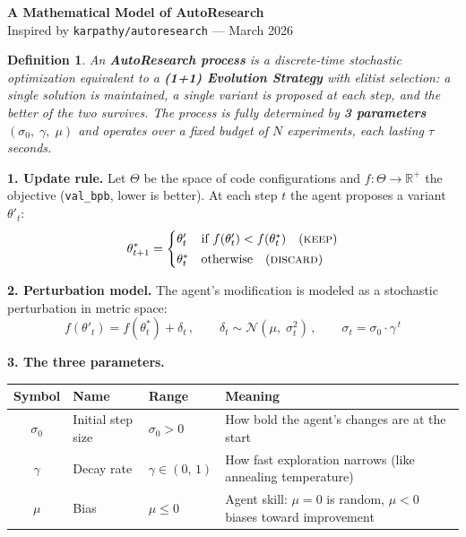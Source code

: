 \documentclass[10pt,a4paper]{article}
\newtheorem*{definition}{Definition}
\begin{document}
\begin{center}
{\Large\bfseries A Mathematical Model of AutoResearch}\\[3pt]
{\small Inspired by \texttt{karpathy/autoresearch} --- March 2026}
\end{center}

\vspace{0.4em}

\begin{definition}
An \textbf{AutoResearch process} is a discrete-time stochastic optimization
equivalent to a \textbf{(1+1) Evolution Strategy} with elitist selection:
a single solution is maintained, a single variant is proposed at each step,
and the better of the two survives.
The process is fully determined by \textbf{3 parameters} $(\sigma_0,\;\gamma,\;\mu)$
and operates over a fixed budget of $N$ experiments, each lasting $\tau$ seconds.
\end{definition}

\vspace{0.3em}

\noindent\textbf{1.\; Update rule.}\;
Let $\Theta$ be the space of code configurations and
$f\!:\Theta\!\to\!\mathbb{R}^+$ the objective (\texttt{val\_bpb}, lower is better).
At each step $t$ the agent proposes a variant $\theta'_t$:
%
\begin{equation*}
\theta^*_{t+1} = 
\begin{cases}
\theta'_t & \text{if } f(\theta'_t) < f(\theta^*_t) \quad (\textsc{keep})\\[2pt]
\theta^*_t & \text{otherwise} \quad (\textsc{discard})
\end{cases}
\end{equation*}

\noindent\textbf{2.\; Perturbation model.}\;
The agent's modification is modeled as a stochastic perturbation in metric space:
%
\begin{equation*}
f(\theta'_t) = f(\theta^*_t) + \delta_t\,,
\qquad
\delta_t \sim \mathcal{N}(\mu,\;\sigma_t^2)\,,
\qquad
\sigma_t = \sigma_0 \cdot \gamma^{\,t}
\end{equation*}

\noindent\textbf{3.\; The three parameters.}

\vspace{0.3em}

\begin{center}
\renewcommand{\arraystretch}{1.25}
\begin{tabular}{@{}clll@{}}
\toprule
\textbf{Symbol} & \textbf{Name} & \textbf{Range} & \textbf{Meaning} \\
\midrule
$\sigma_0$ & Initial step size & $\sigma_0 > 0$ & How bold the agent's changes are at the start \\
$\gamma$ & Decay rate & $\gamma \in (0,\,1)$ & How fast exploration narrows (like annealing temperature) \\
$\mu$ & Bias & $\mu \leq 0$ & Agent skill: $\mu\!=\!0$ is random, $\mu\!<\!0$ biases toward improvement \\
\bottomrule
\end{tabular}
\end{center}
\end{document}
